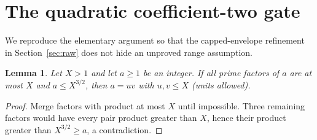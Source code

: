 \documentclass[11pt,a4paper]{article}
\newtheorem{lemma}[theorem]{Lemma}
\begin{document}
\appendix
\section{The quadratic coefficient-two gate}\label{app:quadratic}
We reproduce the elementary argument so that the capped-envelope refinement in Section~\ref{sec:raw}
does not hide an unproved range assumption.

\begin{lemma}
Let $X>1$ and let $a\ge1$ be an integer. If all prime factors of $a$ are at most $X$ and $a\le X^{3/2}$,
then $a=uv$ with $u,v\le X$ (units allowed).
\end{lemma}
\begin{proof}
Merge factors with product at most $X$ until impossible. Three remaining
factors would have every pair product greater than $X$, hence their
product greater than $X^{3/2}\ge a$, a contradiction.
\end{proof}
\end{document}
